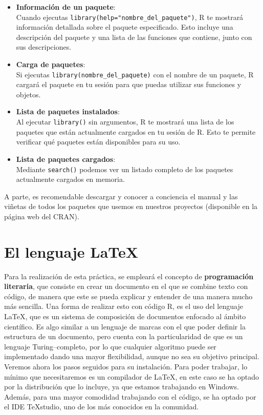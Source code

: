 \documentclass[12pt]{report}\usepackage[]{graphicx}\usepackage[dvipsnames]{xcolor}
\begin{document}
\begin{itemize}
				\item \textbf{Información de un paquete}: \\
				Cuando ejecutas \texttt{library(help="nombre\_del\_paquete")}, R te mostrará información detallada sobre el paquete especificado. Esto incluye una descripción del paquete y una lista de las funciones que contiene, junto con sus descripciones.
				
				\item \textbf{Carga de paquetes}: \\
				Si ejecutas \texttt{library(nombre\_del\_paquete)} con el nombre de un paquete, R cargará el paquete en tu sesión para que puedas utilizar sus funciones y objetos.
				
				\item \textbf{Lista de paquetes instalados}: \\
				Al ejecutar \texttt{library()} sin argumentos, R te mostrará una lista de los paquetes que están actualmente cargados en tu sesión de R. Esto te permite verificar qué paquetes están disponibles para su uso.
				
				\item \textbf{Lista de paquetes cargados}: \\
				Mediante \texttt{search()} podemos ver un listado completo de los paquetes actualmente cargados en memoria.
				
			\end{itemize}
			
			A parte, es recomendable descargar y conocer a conciencia el manual y las viñetas de todos los paquetes que usemos en nuestros proyectos (disponible en la página web del CRAN).
		
		\section*{El lenguaje \LaTeX}

			Para la realización de esta práctica, se empleará el concepto de \textbf{programación literaria}, que consiste en crear un documento en el que se combine texto con código, de manera que este se pueda explicar y entender de una manera mucho más sencilla. Una forma de realizar esto con código R, es el uso del lenguaje \LaTeX{}, que es un sistema de composición de documentos enfocado al ámbito científico. Es algo similar a un lenguaje de marcas con el que poder definir la estructura de un documento, pero cuenta con la particularidad de que es un lenguaje Turing--completo, por lo que cualquier algoritmo puede ser implementado dando una mayor flexibilidad, aunque no sea su objetivo principal. Veremos ahora los pasos seguidos para su instalación. Para poder trabajar, lo mínimo que necesitaremos es un compilador de \LaTeX{}, en este caso se ha optado por la distribución  que lo incluye, ya que estamos trabajando en Windows. Además, para una mayor comodidad trabajando con el código, se ha optado por el IDE \TeX{}studio, uno de los más conocidos en la comunidad. \\
			
\end{document}

